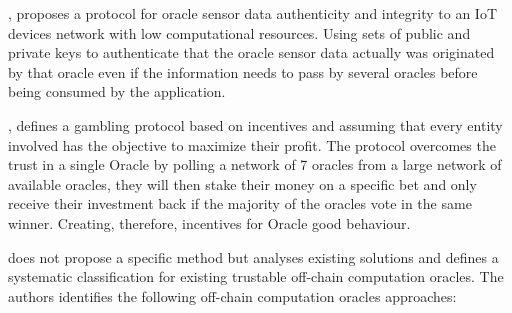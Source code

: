 \cite{Gordon2017ProvenanceSensorsb}, proposes a protocol for oracle sensor data authenticity and integrity to an IoT devices network with low computational resources. Using sets of public and private keys to authenticate that the oracle sensor data actually was originated by that oracle even if the information needs to pass by several oracles before being consumed by the application.

\cite{MontotoMonroy2018BitcoinBlockchain}, defines a gambling protocol based on incentives and assuming that every entity involved has the objective to maximize their profit. The protocol overcomes the trust in a single Oracle by polling a network of 7 oracles from a large network of available oracles, they will then stake their money on a specific bet and only receive their investment back if the majority of the oracles vote in the same winner. Creating, therefore, incentives for Oracle good behaviour.

\cite{Eberhardt2018Off-chainingComputations} does not propose a specific method but analyses existing solutions and defines a systematic classification for existing trustable off-chain computation oracles. The authors identifies the following off-chain computation oracles approaches:

